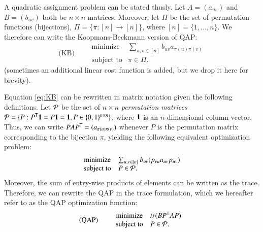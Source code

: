 \documentclass[preprint,11pt]{elsarticle}
\begin{document}

A quadratic assignment problem can be stated thusly.  Let $A=(a_{uv})$ and $B=(b_{uv})$ both be $n \times n$ matrices.   Moreover, let $\Pi$ be the set of permutation functions (bijections), $\Pi=\{\pi : [n] \to [n] \}$, where $[n]=\{1,\ldots, n\}$. We therefore can write the Koopmans-Beckmann version of QAP:
\begin{equation}
\text{(KB)} \qquad  
\begin{array}{cl}
			\text{minimize}   &\sum_{u,v \in [n]} b_{uv}a_{\pi(u)\pi(v)} \\
			\text{subject to}  &\pi \in \Pi.   
\end{array}\label{eq:KB}
\end{equation}
(sometimes an additional linear cost function is added, but we drop it here for brevity).

Equation \ref{eq:KB} can be rewritten in matrix notation given the following definitions. Let $\mathcal{P}$ be the set of  $n \times n$ \emph{permutation matrices}  $\mathcal{P}=\{P : P^{\mathsf{T}} \boldsymbol{1} = P \boldsymbol{1} = \boldsymbol{1}, P \in \{0,1\}^{n \times n}\}$, where $\boldsymbol{1}$ is an $n$-dimensional column vector. Thus, we can write $PAP^{\mathsf{T}}=(a_{\pi(u)\pi(v)})$ whenever $P$ is the permutation matrix corresponding to the bijection $\pi$, yielding the following equivalent optimization problem:
\begin{equation*}
\begin{array}{cl}
			\text{minimize}   &\sum_{u,v \in [n]} b_{uv} (p_{vu} a_{uv} p_{uv}) \\
			\text{subject to}  &P \in \mathcal{P}.   
\end{array}\label{eq:QAP}
\end{equation*}
Moreover, the sum of entry-wise products of elements can be written as the trace.  Therefore, we can rewrite the QAP in the trace formulation, which we hereafter refer to as the QAP optimization function:
\begin{equation}
\text{(QAP)} \qquad  
\begin{array}{cl}
			\text{minimize}   & tr(B P^{\mathsf{T}} A P) \\
			\text{subject to}  &P \in \mathcal{P}.   
\end{array}\label{eq:QAP}
\end{equation}
\end{document}
